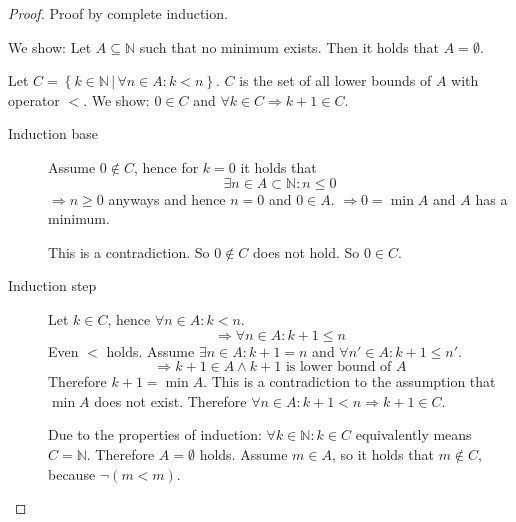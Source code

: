 \documentclass[a4paper,landscape,twocolumn]{article}
\theoremstyle{definition}
\newcommand\setdef[2]{\left\{#1\,|\,#2\right\}}
\begin{document}
\begin{proof}
  Proof by complete induction.

  We show: Let $A \subseteq \mathbb N$ such that no minimum exists.
  Then it holds that $A = \emptyset$.

  Let $C = \setdef{k \in \mathbb N}{\forall n \in A: k < n}$.
  $C$ is the set of all lower bounds of $A$ with operator $<$.
  We show: $0 \in C$ and $\forall k \in C \Rightarrow k + 1 \in C$.

  \begin{description}
    \item[Induction base]
      Assume $0 \not\in C$, hence for $k = 0$ it holds that
      \[ \exists n \in A \subset \mathbb N: n \leq 0 \]
      $\Rightarrow n \geq 0$ anyways and hence $n = 0$ and $0 \in A$.
      $\Rightarrow 0 = \min{A}$ and $A$ has a minimum.

      This is a contradiction. So $0 \not \in C$ does not hold.
      So $0 \in C$.
    \item[Induction step]
      Let $k \in C$, hence $\forall n \in A: k < n$.
      \[ \Rightarrow \forall n \in A: k + 1 \leq n \]
      Even $<$ holds. Assume $\exists n \in A: k + 1 = n$ and
      $\forall n' \in A: k + 1 \leq n'$.
      \[ \Rightarrow k + 1 \in A \land k + 1 \text{ is lower bound of } A \]
      Therefore $k + 1 = \min{A}$.
      This is a contradiction to the assumption that $\min{A}$ does not exist.
      Therefore $\forall n \in A: k + 1 < n \Rightarrow k + 1 \in C$.

      Due to the properties of induction: $\forall k \in \mathbb N: k \in C$
      equivalently means $C = \mathbb N$.
      Therefore $A = \emptyset$ holds.
      Assume $m \in A$, so it holds that $m \not\in C$, because $\neg (m < m)$.
  \end{description}
\end{proof}
\end{document}
